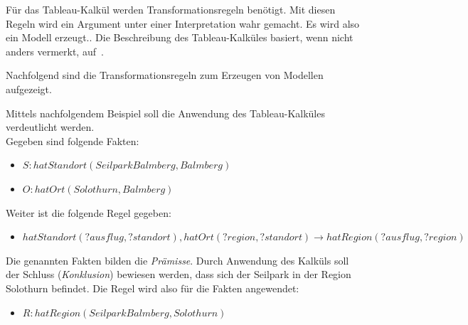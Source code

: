 Für das Tableau-Kalkül werden Transformationsregeln benötigt. Mit diesen Regeln wird ein Argument unter einer Interpretation wahr gemacht. Es wird also ein Modell erzeugt.\cite{baumkalkuel}. Die Beschreibung des Tableau-Kalküles basiert, wenn nicht anders vermerkt, auf~\cite{baumkalkuel}.

Nachfolgend sind die Transformationsregeln zum Erzeugen von Modellen aufgezeigt.

\begin{table}[H]
\centering
{} \hfill
{}
\label{fig:tableau:regeln}
\end{table}

Mittels nachfolgendem Beispiel soll die Anwendung des Tableau-Kalküles verdeutlicht werden.\\
Gegeben sind folgende Fakten:
\begin{itemize}
    \item $S: hatStandort(SeilparkBalmberg, Balmberg)$
    \item $O: hatOrt(Solothurn, Balmberg)$
\end{itemize}
Weiter ist die folgende Regel gegeben:
\begin{itemize}
    \item $hatStandort(?ausflug, ?standort), hatOrt(?region, ?standort) \rightarrow hatRegion(?ausflug, ?region)$
\end{itemize}
Die genannten Fakten bilden die \textit{Prämisse}. Durch Anwendung des Kalküls soll der Schluss (\textit{Konklusion}) bewiesen werden, dass sich der Seilpark in der Region Solothurn befindet. Die Regel wird also für die Fakten angewendet:
\begin{itemize}
    \item $R: hatRegion(SeilparkBalmberg, Solothurn)$
\end{itemize}

